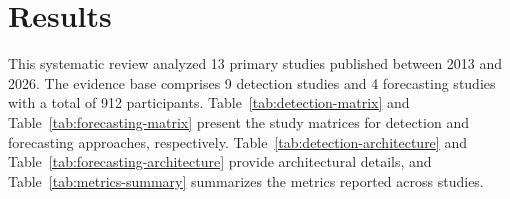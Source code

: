 
\section{Results}
\label{sec:results}

This systematic review analyzed 13 primary studies published between 2013 and 2026. The evidence base comprises 9 detection studies and 4 forecasting studies with a total of 912 participants. Table~\ref{tab:detection-matrix} and Table~\ref{tab:forecasting-matrix} present the study matrices for detection and forecasting approaches, respectively. Table~\ref{tab:detection-architecture} and Table~\ref{tab:forecasting-architecture} provide architectural details, and Table~\ref{tab:metrics-summary} summarizes the metrics reported across studies.










